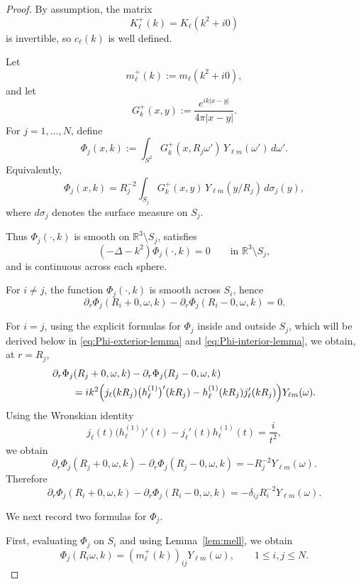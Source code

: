 \documentclass[10pt,a4paper]{amsart}
\newcommand{\R}{\mathbb{R}}
\begin{document}
\begin{proof}
By assumption, the matrix
\[
K_\ell^+(k)=K_\ell(k^2+i0)
\]
is invertible, so $c_\ell(k)$ is well defined.

Let
\[
m_\ell^+(k):=m_\ell(k^2+i0),
\]
and let
\[
G_k^+(x,y):=\frac{e^{ik|x-y|}}{4\pi|x-y|}.
\]
For $j=1,\ldots,N$, define
\[
\Phi_j(x,k)
:=
\int_{S^2} G_k^+(x,R_j\omega')\,Y_{\ell m}(\omega')\,d\omega'.
\]
Equivalently,
\[
\Phi_j(x,k)
=
R_j^{-2}
\int_{S_j} G_k^+(x,y)\,Y_{\ell m}(y/R_j)\,d\sigma_j(y),
\]
where $d\sigma_j$ denotes the surface measure on $S_j$.

Thus $\Phi_j(\cdot,k)$ is smooth on $\R^3\setminus S_j$, satisfies
\[
(-\Delta-k^2)\Phi_j(\cdot,k)=0
\qquad \text{in }\R^3\setminus S_j,
\]
and is continuous across each sphere.

For $i\neq j$, the function $\Phi_j(\cdot,k)$ is smooth across $S_i$, hence
\[
\partial_r\Phi_j(R_i+0,\omega,k)-\partial_r\Phi_j(R_i-0,\omega,k)=0.
\]

For $i=j$, using the explicit formulas for $\Phi_j$ inside and outside $S_j$,
which will be derived below in \eqref{eq:Phi-exterior-lemma} and
\eqref{eq:Phi-interior-lemma}, we obtain, at $r=R_j$,
\begin{align*}
&\partial_r\Phi_j(R_j+0,\omega,k)-\partial_r\Phi_j(R_j-0,\omega,k)
\\
&\qquad
=
ik^2\Bigl(
j_\ell(kR_j)\bigl(h_\ell^{(1)}\bigr)'(kR_j)
-
h_\ell^{(1)}(kR_j)j_\ell'(kR_j)
\Bigr)Y_{\ell m}(\omega).
\end{align*}
Using the Wronskian identity
\[
j_\ell(t)\bigl(h_\ell^{(1)}\bigr)'(t)-j_\ell'(t)h_\ell^{(1)}(t)
=
\frac{i}{t^2},
\]
we obtain
\[
\partial_r\Phi_j(R_j+0,\omega,k)-\partial_r\Phi_j(R_j-0,\omega,k)
=
-R_j^{-2}Y_{\ell m}(\omega).
\]
Therefore
\begin{equation}\label{eq:jump-Phi-lemma}
\partial_r\Phi_j(R_i+0,\omega,k)-\partial_r\Phi_j(R_i-0,\omega,k)
=
-\delta_{ij}R_i^{-2}Y_{\ell m}(\omega).
\end{equation}

We next record two formulas for $\Phi_j$.

First, evaluating $\Phi_j$ on $S_i$ and using Lemma~\ref{lem:mell}, we obtain
\begin{equation}\label{eq:trace-Phi-lemma}
\Phi_j(R_i\omega,k)
=
(m_\ell^+(k))_{ij}Y_{\ell m}(\omega),
\qquad 1\le i,j\le N.
\end{equation}


\end{proof}
\end{document}
